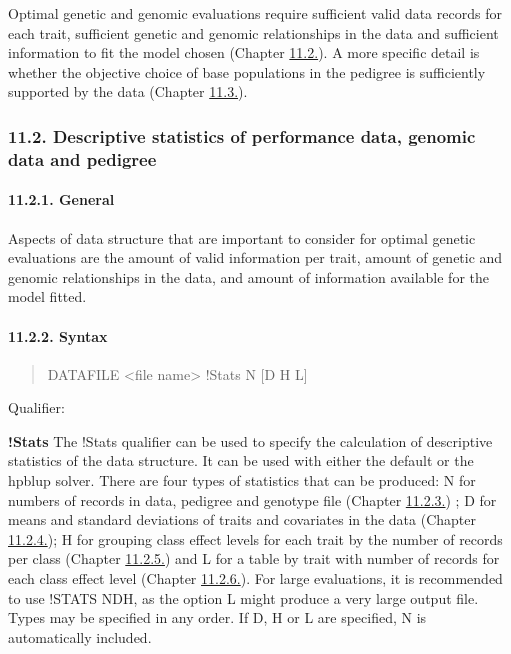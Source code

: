 Optimal genetic and genomic evaluations require sufficient valid data
records for each trait, sufficient genetic and genomic relationships in
the data and sufficient information to fit the model chosen (Chapter
\hyperref[Desc03]{11.2.}). A more specific detail is whether the
objective choice of base populations in the pedigree is sufficiently
supported by the data (Chapter \hyperref[Desc11]{11.3.}).

\subsubsection{11.2. Descriptive statistics of performance data, genomic
data and pedigree}\label{Desc03}

\paragraph{11.2.1. General}\label{Desc04}

Aspects of data structure that are important to consider for optimal
genetic evaluations are the amount of valid information per trait,
amount of genetic and genomic relationships in the data, and amount of
information available for the model fitted.

\paragraph{11.2.2. Syntax}\label{Desc05}

\begin{quote}
DATAFILE \textless file name\textgreater{} !Stats N {[}D H L{]}
\end{quote}

Qualifier:

\textbf{!Stats} The !Stats qualifier can be used to specify the
calculation of descriptive statistics of the data structure. It can be
used with either the default or the hpblup solver. There are four types
of statistics that can be produced: N for numbers of records in data,
pedigree and genotype file (Chapter \hyperref[Desc06]{11.2.3.}) ; D for
means and standard deviations of traits and covariates in the data
(Chapter \hyperref[Desc07]{11.2.4.}); H for grouping class effect levels
for each trait by the number of records per class (Chapter
\hyperref[Desc08]{11.2.5.}) and L for a table by trait with number of
records for each class effect level (Chapter
\hyperref[Desc09]{11.2.6.}). For large evaluations, it is recommended to
use !STATS NDH, as the option L might produce a very large output file.
Types may be specified in any order. If D, H or L are specified, N is
automatically included.

